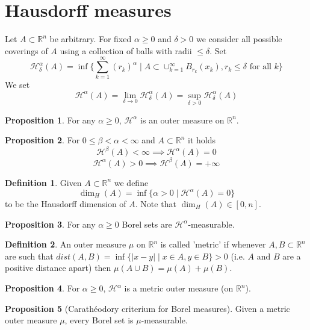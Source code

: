 \documentclass[a4paper,14pt]{extarticle}
\theoremstyle{definition}
\newtheorem{definition}{Definition}
\newtheorem{proposition}{Proposition}
\begin{document}
\section{Hausdorff measures}
Let $A\subset\mathbb{R}^n$ be arbitrary. For fixed $\alpha\geq0$ and $\delta>0$ we consider all possible coverings of $A$ using a collection of balls with radii $\leq\delta$. Set
\[\mathcal{H}_\delta^\alpha(A)=\inf\bigl\{\sum_{k=1}^\infty(r_k)^\alpha\mid A\subset\cup_{k=1}^\infty B_{r_k}(x_k), r_k\leq\delta\text{ for all }k\bigr\}\] We set 
\[\mathcal{H}^\alpha(A)=\lim\limits_{\delta\to0}\mathcal{H}_\delta^\alpha(A)=\sup\limits_{\delta>0}\mathcal{H}_\delta^\alpha(A)\]
\begin{proposition}
  For any $\alpha\geq0$, $\mathcal{H}^\alpha$ is an outer measure on $\mathbb{R}^n$.
\end{proposition}
\begin{proposition}
  For $0\leq\beta<\alpha <\infty$ and $A\subset\mathbb{R}^n$ it holds 
  \[\mathcal{H}^\beta(A)<\infty\implies\mathcal{H}^\alpha(A)=0\] \[\mathcal{H}^\alpha(A)>0\implies\mathcal{H}^\beta(A)=+\infty\]
\end{proposition}
\begin{definition}
  Given $A\subset\mathbb{R}^n$ we define 
  \[\dim_H(A)=\inf\{\alpha>0\mid\mathcal{H}^\alpha(A)=0\}\] to be the Hausdorff dimension of $A$. Note that $\dim_H(A)\in[0,n]$.
\end{definition}
\begin{proposition}
  For any $\alpha\geq0$ Borel sets are $\mathcal{H}^\alpha$-measurable.
\end{proposition}
\begin{definition}
  An outer measure $\mu$ on $\mathbb{R}^n$ is called 'metric' if whenever $A,B\subset\mathbb{R}^n$ are such that $dist(A,B)=\inf\{|x-y|\mid x\in A, y\in B\}>0$ (i.e. $A$ and $B$ are a positive distance apart) then $\mu(A\cup B)=\mu(A)+\mu(B)$.
\end{definition}
\begin{proposition}
  For $\alpha\geq0$, $\mathcal{H}^\alpha$ is a metric outer measure (on $\mathbb{R}^n$).
\end{proposition}
\begin{proposition}[Carathéodory criterium for Borel measures]
  Given a metric outer measure $\mu$, every Borel set is $\mu$-measurable.
\end{proposition}

\newpage
\end{document}
